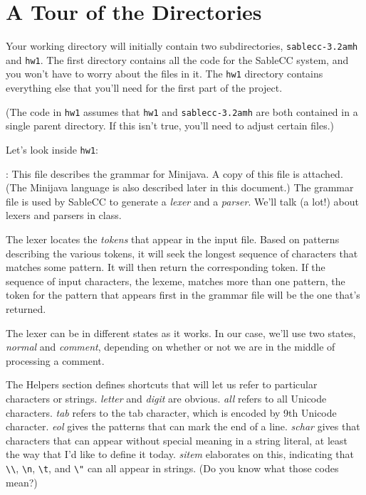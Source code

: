 \documentclass[11pt]{article}
\begin{document}
\section{A Tour of the Directories}
Your working directory will initially contain two subdirectories, \verb'sablecc-3.2amh' and \verb'hw1'.  The first directory contains all the code for the SableCC system, and you won't have to worry about the files in it.  The \verb'hw1' directory contains everything else that you'll need for the first part of the project.

(The code in \verb'hw1' assumes that \verb'hw1' and \verb'sablecc-3.2amh' are both contained in a single parent directory.  If this isn't true, you'll need to adjust certain files.)

\mbox{}\par Let's look inside \verb'hw1': \par \mbox{}

:  This file describes the grammar for Minijava.  A copy of this file is attached.  (The Minijava language is also described later in this document.)  The grammar file is used by SableCC to generate a {\em lexer} and a {\em parser}.  We'll talk (a lot!) about lexers and parsers in class.

The lexer locates the {\em tokens} that appear in the input file.  
Based on patterns describing the various tokens, it will seek
the longest sequence of characters that matches some pattern.  It will
then return the corresponding token.  If the sequence of input
characters, the lexeme, matches more than one pattern, the token for
the pattern that appears first in the grammar file will be the one that's returned.

The lexer can be in different states as it works.  In our case, we'll
use two states, {\em normal} and {\em comment}, depending on whether or not we
are in the middle of processing a comment.

The Helpers section defines shortcuts that will let us refer to
particular characters or strings.  {\em letter} and {\em digit} are obvious.
{\em all} refers to all Unicode characters.  {\em tab} refers to the tab
character, which is encoded by 9th Unicode character.  {\em eol} gives the
patterns that can mark the end of a line.  {\em schar} gives that
characters that can appear without special meaning in a string literal, at
least the way that I'd like to define it today.  {\em sitem} elaborates on
this, indicating that \verb'\\', \verb'\n', \verb'\t', and \verb'\"' can all appear in strings.  (Do
you know what those codes mean?)
\end{document}
